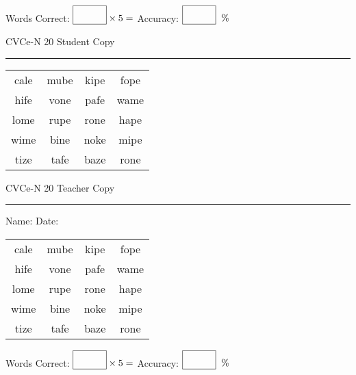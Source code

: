 \documentclass{memoir}
\begin{document}
\small

Words Correct: $\fbox{\phantom{\huge 100}} \times 5 = $ Accuracy: $\fbox{\phantom{\huge 100}}\;\; \%$ 

\vfill

\newpage



\footnotesize \noindent
CVCe-N 20 \hfill Student Copy
\smallskip
\hrule

\Large

\setlength{\tabcolsep}{14pt}
\def\arraystretch{2}

{\selectfont


\begin{vplace}[0.5]
\begin{center}
\begin{tabular}{cccc}
cale & mube & kipe & fope \\
hife & vone & pafe & wame \\
lome & rupe & rone & hape \\
wime & bine & noke & mipe \\
tize & tafe & baze & rone \\
\end{tabular}
\end{center}
\end{vplace}

}

\newpage

\footnotesize \noindent
CVCe-N 20 \hfill Teacher Copy
\smallskip
\hrule

\small

\vfill

\noindent
Name: \underline{\hspace{1.75in}} \hfill Date: \underline{\hspace{1in}}

\Large

{\selectfont


\begin{vplace}[0.5]
\begin{center}
\begin{tabular}{cccc}
cale & mube & kipe & fope \\
hife & vone & pafe & wame \\
lome & rupe & rone & hape \\
wime & bine & noke & mipe \\
tize & tafe & baze & rone \\
\end{tabular}
\end{center}
\end{vplace}



}

\small

Words Correct: $\fbox{\phantom{\huge 100}} \times 5 = $ Accuracy: $\fbox{\phantom{\huge 100}}\;\; \%$ 

\vfill

\end{document}
